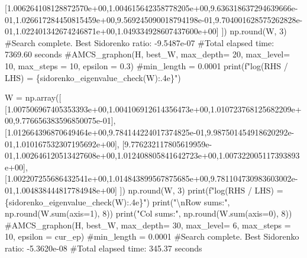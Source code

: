 \documentclass[
  letterpaper,
  DIV=11,
  numbers=noendperiod]{scrartcl}
\newenvironment{Shaded}{\begin{snugshade}}{\end{snugshade}}
\newcommand{\BuiltInTok}[1]{\textcolor[rgb]{0.00,0.23,0.31}{#1}}
\newcommand{\CharTok}[1]{\textcolor[rgb]{0.13,0.47,0.30}{#1}}
\newcommand{\CommentTok}[1]{\textcolor[rgb]{0.37,0.37,0.37}{#1}}
\newcommand{\DecValTok}[1]{\textcolor[rgb]{0.68,0.00,0.00}{#1}}
\newcommand{\FloatTok}[1]{\textcolor[rgb]{0.68,0.00,0.00}{#1}}
\newcommand{\NormalTok}[1]{\textcolor[rgb]{0.00,0.23,0.31}{#1}}
\newcommand{\OperatorTok}[1]{\textcolor[rgb]{0.37,0.37,0.37}{#1}}
\newcommand{\SpecialCharTok}[1]{\textcolor[rgb]{0.37,0.37,0.37}{#1}}
\newcommand{\SpecialStringTok}[1]{\textcolor[rgb]{0.13,0.47,0.30}{#1}}
\newcommand{\StringTok}[1]{\textcolor[rgb]{0.13,0.47,0.30}{#1}}
\begin{document}
\begin{Shaded}
\begin{Highlighting}[]
\NormalTok{[}\FloatTok{1.006264108128872570e+00}\NormalTok{,}\FloatTok{1.004615642358778205e+00}\NormalTok{,}\FloatTok{9.636318637294639666e{-}01}\NormalTok{,}\FloatTok{1.026617284450815459e+00}\NormalTok{,}\FloatTok{9.569245090018794198e{-}01}\NormalTok{,}\FloatTok{9.704001628575262828e{-}01}\NormalTok{,}\FloatTok{1.022401342674246871e+00}\NormalTok{,}\FloatTok{1.049334928607437600e+00}\NormalTok{]}
\NormalTok{])}
\NormalTok{np.}\BuiltInTok{round}\NormalTok{(W, }\DecValTok{3}\NormalTok{)}
\CommentTok{\#Search complete. Best Sidorenko ratio: {-}9.5487e{-}07}
\CommentTok{\#Total elapsed time: 7369.60 seconds}
\CommentTok{\#AMCS\_graphon(H, best\_W, max\_depth= 20, max\_level= 10, max\_steps = 10, epsilon = 0.3)}
\CommentTok{\#min\_length = 0.0001}
\BuiltInTok{print}\NormalTok{(}\SpecialStringTok{f"log(RHS / LHS) = }\SpecialCharTok{\{}\NormalTok{sidorenko\_eigenvalue\_check(W)}\SpecialCharTok{:.4e\}}\SpecialStringTok{"}\NormalTok{)}

\NormalTok{W }\OperatorTok{=}\NormalTok{ np.array([}
\NormalTok{[}\FloatTok{1.007506967405353393e+00}\NormalTok{,}\FloatTok{1.004106912614356473e+00}\NormalTok{,}\FloatTok{1.010723768125682209e+00}\NormalTok{,}\FloatTok{9.776656383596850075e{-}01}\NormalTok{],}
\NormalTok{[}\FloatTok{1.012664396870649464e+00}\NormalTok{,}\FloatTok{9.784144224017374825e{-}01}\NormalTok{,}\FloatTok{9.987501454918620292e{-}01}\NormalTok{,}\FloatTok{1.010167532307195692e+00}\NormalTok{],}
\NormalTok{[}\FloatTok{9.776232117805619959e{-}01}\NormalTok{,}\FloatTok{1.002646120513427608e+00}\NormalTok{,}\FloatTok{1.012408805841642723e+00}\NormalTok{,}\FloatTok{1.007322005117393893e+00}\NormalTok{],}
\NormalTok{[}\FloatTok{1.002207255686432541e+00}\NormalTok{,}\FloatTok{1.014843899567875685e+00}\NormalTok{,}\FloatTok{9.781104730983603002e{-}01}\NormalTok{,}\FloatTok{1.004838444817784948e+00}\NormalTok{]}
\NormalTok{])}
\NormalTok{np.}\BuiltInTok{round}\NormalTok{(W, }\DecValTok{3}\NormalTok{)}
\BuiltInTok{print}\NormalTok{(}\SpecialStringTok{f"log(RHS / LHS) = }\SpecialCharTok{\{}\NormalTok{sidorenko\_eigenvalue\_check(W)}\SpecialCharTok{:.4e\}}\SpecialStringTok{"}\NormalTok{)}
\BuiltInTok{print}\NormalTok{(}\StringTok{"}\CharTok{\textbackslash{}n}\StringTok{Row sums:"}\NormalTok{, np.}\BuiltInTok{round}\NormalTok{(W.}\BuiltInTok{sum}\NormalTok{(axis}\OperatorTok{=}\DecValTok{1}\NormalTok{), }\DecValTok{8}\NormalTok{))}
\BuiltInTok{print}\NormalTok{(}\StringTok{"Col sums:"}\NormalTok{, np.}\BuiltInTok{round}\NormalTok{(W.}\BuiltInTok{sum}\NormalTok{(axis}\OperatorTok{=}\DecValTok{0}\NormalTok{), }\DecValTok{8}\NormalTok{))}
\CommentTok{\#AMCS\_graphon(H, best\_W, max\_depth= 30, max\_level= 6, max\_steps = 10, epsilon = cur\_ep)}
\CommentTok{\#min\_length = 0.0001}
\CommentTok{\#Search complete. Best Sidorenko ratio: {-}5.3620e{-}08}
\CommentTok{\#Total elapsed time: 345.37 seconds}


\end{Highlighting}
\end{Shaded}
\end{document}
